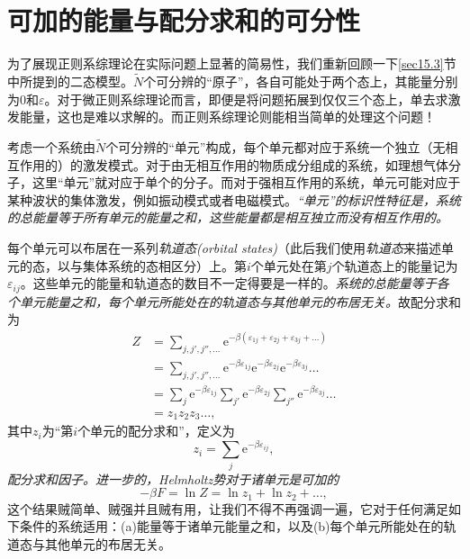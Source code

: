 \section{可加的能量与配分求和的可分性}\label{sec16.2}

为了展现正则系综理论在实际问题上显著的简易性，我们重新回顾一下\ref{sec15.3}节中所提到的二态模型。$\tilde N$个可分辨的``原子''，各自可能处于两个态上，其能量分别为$0$和$\varepsilon$。对于微正则系综理论而言，即便是将问题拓展到仅仅三个态上，单去求激发能量，这也是难以求解的。而正则系综理论则能相当简单的处理这个问题！

考虑一个系统由$\tilde N$个可分辨的``单元''构成，每个单元都对应于系统一个独立（无相互作用的）的激发模式。对于由无相互作用的物质成分组成的系统，如理想气体分子，这里``单元''就对应于单个的分子。而对于强相互作用的系统，单元可能对应于某种波状的集体激发，例如振动模式或者电磁模式。{\it ``单元''的标识性特征是，系统的总能量等于所有单元的能量之和，这些能量都是相互独立而没有相互作用的。}

每个单元可以布居在一系列{\it 轨道态(orbital states)}（此后我们使用{\it 轨道态}来描述单元的态，以与集体系统的态相区分）上。第$i$个单元处在第$j$个轨道态上的能量记为$\varepsilon_{ij}$。这些单元的能量和轨道态的数目不一定得要是一样的。{\it 系统的总能量等于各个单元能量之和，每个单元所能处在的轨道态与其他单元的布居无关。}故配分求和为
\begin{align}
Z &= \sum\limits_{j,j',j'',\dots}\mathrm e^{-\beta (\varepsilon_{1j}+\varepsilon_{2j}+\varepsilon_{3j}+\dots)}\label{equ16.14} \\
 &= \sum\limits_{j,j',j'',\dots}\mathrm e^{-\beta\varepsilon_{1j}}\mathrm e^{-\beta\varepsilon_{2j}}\mathrm e^{-\beta\varepsilon_{3j}}\dots \\
 &= \sum\limits_{j}\mathrm e^{-\beta\varepsilon_{1j}}\sum\limits_{j'}\mathrm e^{-\beta\varepsilon_{2j}}\sum\limits_{j''}\mathrm e^{-\beta\varepsilon_{3j}}\dots \\
 &= z_1z_2z_3\dots, \label{equ16.17}
\end{align}
其中$z_i$为“第$i$个单元的配分求和”，定义为
\begin{equation}
z_i = \sum\limits_{j}\mathrm e^{-\beta\varepsilon_{ij}},
\end{equation}
{\it 配分求和因子。进一步的，Helmholtz势对于诸单元是可加的}
\begin{equation}
-\beta F = \ln Z = \ln z_1+\ln z_2+\dots, \label{equ16.19}
\end{equation}
这个结果贼简单、贼强并且贼有用，让我们不得不再强调一遍，它对于任何满足如下条件的系统适用：(a)能量等于诸单元能量之和，以及(b)每个单元所能处在的轨道态与其他单元的布居无关。

